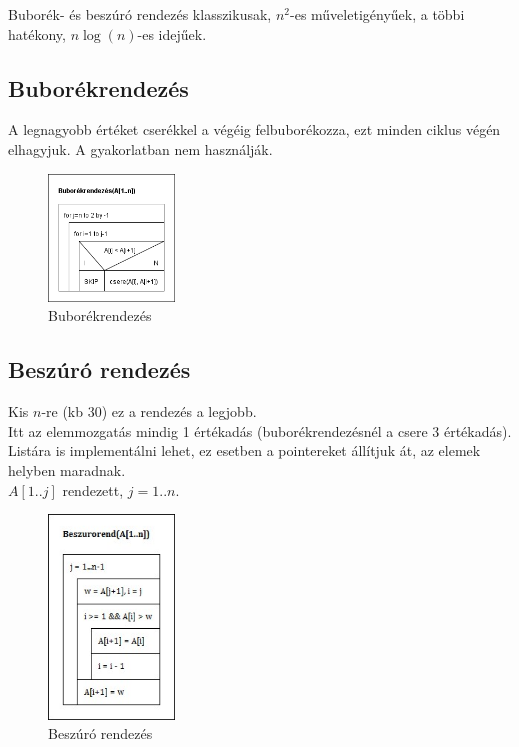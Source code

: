 \documentclass[margin=0px]{article}
\begin{document}
	Buborék- és beszúró rendezés klasszikusak, $n^2$-es műveletigényűek, a többi hatékony, $n\log(n)$-es idejűek.
	
	\subsection{Buborékrendezés}
	
	A legnagyobb értéket cserékkel a végéig felbuborékozza, ezt minden ciklus végén elhagyjuk. A gyakorlatban nem használják.
	\begin{figure}[H]
		\centering
		\includegraphics[width=0.3\textwidth]{img/Buborekrendezes.png}
		\caption{Buborékrendezés}
	\end{figure}
	
	\subsection{Beszúró rendezés}
	
	Kis $n$-re (kb 30) ez a rendezés a legjobb. \\
	Itt az elemmozgatás mindig 1 értékadás (buborékrendezésnél a csere 3 értékadás). Listára is implementálni lehet, ez esetben a pointereket állítjuk át, az elemek helyben maradnak. \\
	$A[1..j]$ rendezett, $j=1..n$.
	\begin{figure}[H]
		\centering
		\includegraphics[width=0.3\textwidth]{img/Beszurorend.jpg}
		\caption{Beszúró rendezés}
	\end{figure}
	
\end{document}
